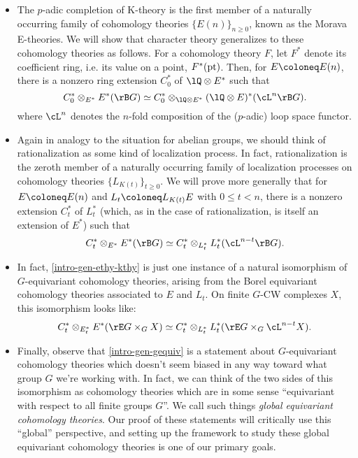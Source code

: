 \begin{itemize}[leftmargin=*]
\item The $p$-adic completion of K-theory is the first member of a
  naturally occurring family of cohomology theories
  $\{E(n)\}_{n \ge 0}$, known as the Morava E-theories. We will show
  that character theory generalizes to these cohomology theories as
  follows. For a cohomology theory $F$, let $F^*$ denote its
  coefficient ring, i.e. its value on a point, $F^*(\mathrm{pt})$. Then, for
  $E \ce E(n)$, there is a nonzero ring extension $C_0^*$ of
  $\lQ \otimes E^*$ such that
  \begin{equation}
    \label{intro-gen-ethy}
    C_0^* \otimes_{E^*} E^*(\rB G) \iso
    C_0^* \otimes_{\lQ \otimes E^*}
    (\lQ \otimes E)^*(\cL^n\rB G).
  \end{equation}
  where $\cL^n$ denotes the $n$-fold composition of the ($p$-adic)
  loop space functor.

\item Again in analogy to the situation for abelian groups, we should
  think of rationalization as some kind of localization process. In
  fact, rationalization is the zeroth member of a naturally occurring
  family of localization processes on cohomology theories
  $\{L_{K(t)}\}_{t \ge 0}$. We will prove more generally that for
  $E \ce E(n)$ and $L_t \ce L_{K(t)}E$ with $0 \le t < n$, there is a
  nonzero extension $C_t^*$ of $L_t^*$ (which, as in the case of
  rationalization, is itself an extension of $E^*$) such that
  \begin{equation}
    \label{intro-gen-ethy-kthy}
    C_t^* \otimes_{E^*} E^*(\rB G) \iso
    C_t^* \otimes_{L_t^*}
    L_t^*(\cL^{n-t}\rB G).
  \end{equation}

\item In fact, \cref{intro-gen-ethy-kthy} is just one instance of a
  natural isomorphism of $G$-equivariant cohomology theories, arising
  from the Borel equivariant cohomology theories associated to $E$ and
  $L_t$. On finite $G$-CW complexes $X$, this isomorphism looks like:
  \begin{equation}
    \label{intro-gen-gequiv}
    C_t^* \otimes_{E_t^*} E^*(\rE G \times_G X) \iso
    C_t^* \otimes_{L_t^*}
    L_t^*(\rE G \times_G \cL^{n-t}X).
  \end{equation}

\item Finally, observe that \cref{intro-gen-gequiv} is a statement
  about $G$-equivariant cohomology theories which doesn't seem biased
  in any way toward what group $G$ we're working with. In fact, we can
  think of the two sides of this isomorphism as cohomology theories
  which are in some sense ``equivariant with respect to all finite
  groups $G$''. We call such things \emph{global equivariant
    cohomology theories}. Our proof of these statements will
  critically use this ``global'' perspective, and setting up the
  framework to study these global equivariant cohomology theories is
  one of our primary goals.
\end{itemize}

